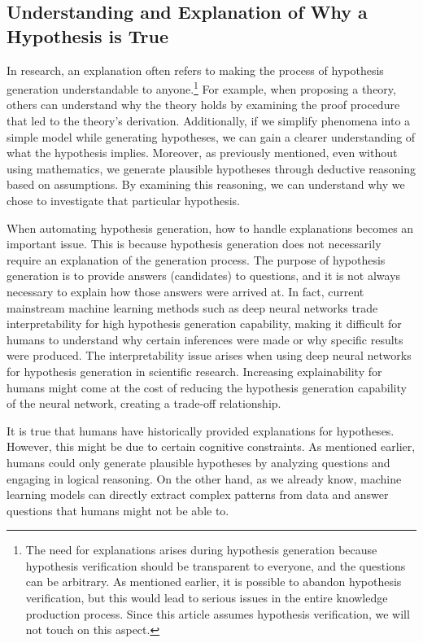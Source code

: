 \documentclass{book}
\begin{document}

\subsection{Understanding and Explanation of Why a Hypothesis is True}
In research, an explanation often refers to making the process of hypothesis generation understandable to anyone.\footnote{
The need for explanations arises during hypothesis generation because hypothesis verification should be transparent to everyone, and the questions can be arbitrary. As mentioned earlier, it is possible to abandon hypothesis verification, but this would lead to serious issues in the entire knowledge production process. Since this article assumes hypothesis verification, we will not touch on this aspect.
} For example, when proposing a theory, others can understand why the theory holds by examining the proof procedure that led to the theory's derivation. Additionally, if we simplify phenomena into a simple model while generating hypotheses, we can gain a clearer understanding of what the hypothesis implies. Moreover, as previously mentioned, even without using mathematics, we generate plausible hypotheses through deductive reasoning based on assumptions. By examining this reasoning, we can understand why we chose to investigate that particular hypothesis.

When automating hypothesis generation, how to handle explanations becomes an important issue. This is because hypothesis generation does not necessarily require an explanation of the generation process. The purpose of hypothesis generation is to provide answers (candidates) to questions, and it is not always necessary to explain how those answers were arrived at. In fact, current mainstream machine learning methods such as deep neural networks trade interpretability for high hypothesis generation capability, making it difficult for humans to understand why certain inferences were made or why specific results were produced. The interpretability issue arises when using deep neural networks for hypothesis generation in scientific research. Increasing explainability for humans might come at the cost of reducing the hypothesis generation capability of the neural network, creating a trade-off relationship.

It is true that humans have historically provided explanations for hypotheses. However, this might be due to certain cognitive constraints. As mentioned earlier, humans could only generate plausible hypotheses by analyzing questions and engaging in logical reasoning. On the other hand, as we already know, machine learning models can directly extract complex patterns from data and answer questions that humans might not be able to.
\end{document}
